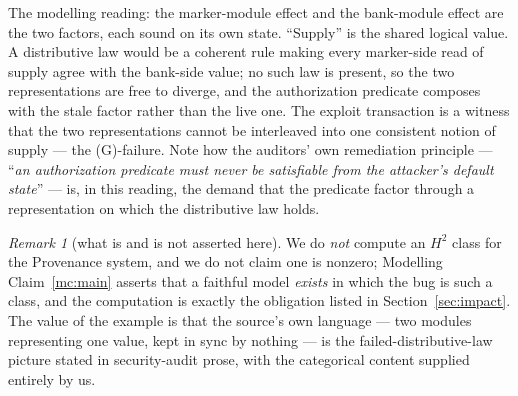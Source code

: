 \documentclass[11pt]{amsart}
\theoremstyle{definition}
\theoremstyle{remark}
\newtheorem{remark}[theorem]{Remark}
\begin{document}
The modelling reading: the marker-module effect and the bank-module effect are the two factors, each
sound on its own state. ``Supply'' is the shared logical value. A distributive law would be a
coherent rule making every marker-side read of supply agree with the bank-side value; no such law is
present, so the two representations are free to diverge, and the authorization predicate composes
with the stale factor rather than the live one. The exploit transaction is a witness that the two
representations cannot be interleaved into one consistent notion of supply --- the (G)-failure. Note
how the auditors' own remediation principle --- ``\emph{an authorization predicate must never be
satisfiable from the attacker's default state}'' \cite{tob-statediv} --- is, in this reading, the
demand that the predicate factor through a representation on which the distributive law holds.

\begin{remark}[what is and is not asserted here]
We do \emph{not} compute an $H^2$ class for the Provenance system, and we do not claim one is nonzero;
Modelling Claim~\ref{mc:main} asserts that a faithful model \emph{exists} in which the bug is such a
class, and the computation is exactly the obligation listed in Section~\ref{sec:impact}. The value of
the example is that the source's own language --- two modules representing one value, kept in sync by
nothing --- is the failed-distributive-law picture stated in security-audit prose, with the
categorical content supplied entirely by us.
\end{remark}
\end{document}
